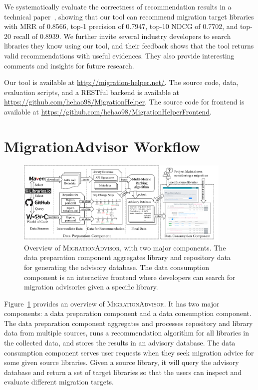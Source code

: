 \documentclass[conference,10pt]{IEEEtran}
\begin{document}
We systematically evaluate the correctness of recommendation results in a technical paper~\cite{our-paper}, showing that our tool can recommend migration target libraries with MRR of 0.8566, top-1 precision of 0.7947, top-10 NDCG of 0.7702, and top-20 recall of 0.8939.
We further invite several industry developers to search libraries they know using our tool, and their feedback shows that the tool returns valid recommendations with useful evidences.
They also provide interesting comments and insights for future research.

Our tool is available at \url{http://migration-helper.net/}. 
The source code, data, evaluation scripts, and a RESTful backend is available at \url{https://github.com/hehao98/MigrationHelper}. The source code for frontend is available at \url{https://github.com/hehao98/MigrationHelperFrontend}.

\section{MigrationAdvisor Workflow}

\begin{figure}[tb]
  \centering
  \includegraphics[width=0.92\textwidth]{fig/ToolDemo.pdf}
  \caption{Overview of \textsc{MigrationAdvisor}, with two major components. The data preparation component aggregates library and repository data for generating the advisory database. The data consumption component is an interactive frontend where developers can search for migration advisories given a specific library.}
  \label{fig:overview}
  \vspace{-5mm}
\end{figure}

Figure~\ref{fig:overview} provides an overview of \textsc{MigrationAdvisor}. 
It has two major components: a data preparation component and a data consumption component.
The data preparation component aggregates and processes repository and library data from multiple sources, runs a recommendation algorithm for all libraries in the collected data, and stores the results in an advisory database. 
The data consumption component serves user requests when they seek migration advice for some given source libraries. Given a source library, it will query the advisory database and return a set of target libraries so that the users can inspect and evaluate different migration targets.
\end{document}
